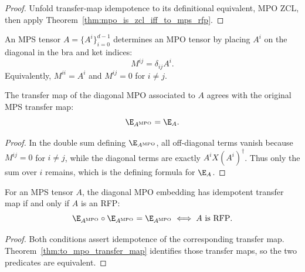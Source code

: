 \begin{proof}
    \leanok
    Unfold transfer-map idempotence to its definitional equivalent, MPO ZCL,
    then apply Theorem~\ref{thm:mpo_is_zcl_iff_to_mps_rfp}.
\end{proof}

\begin{definition}\label{def:to_mpo_tensor}
    \leanok
    An MPS tensor $A = \{A^i\}_{i=0}^{d-1}$ determines an MPO tensor by
    placing $A^i$ on the diagonal in the bra and ket indices:
    \[
        M^{ij} = \delta_{ij} A^i.
    \]
    Equivalently, $M^{ii} = A^i$ and $M^{ij} = 0$ for $i \ne j$.
\end{definition}

\begin{theorem}%
    \label{thm:to_mpo_transfer_map}
    \leanok
    The transfer map of the diagonal MPO associated to $A$ agrees with the
    original MPS transfer map:
    \[
        \E_{A^{\mathrm{MPO}}} = \E_A.
    \]
\end{theorem}

\begin{proof}
    \leanok
    In the double sum defining $\E_{A^{\mathrm{MPO}}}$, all off-diagonal terms
    vanish because $M^{ij} = 0$ for $i \ne j$, while the diagonal terms are
    exactly $A^i X (A^i)^\dagger$. Thus only the sum over $i$ remains, which
    is the defining formula for $\E_A$.
\end{proof}

\begin{theorem}%
    \label{thm:to_mpo_rfp_iff_rfp}
    \leanok
    For an MPS tensor $A$, the diagonal MPO embedding has idempotent transfer
    map if and only if $A$ is an RFP:
    \[
        \E_{A^{\mathrm{MPO}}}\circ\E_{A^{\mathrm{MPO}}}
        = \E_{A^{\mathrm{MPO}}}
        \iff A \text{ is RFP}.
    \]
\end{theorem}

\begin{proof}
    \leanok
    Both conditions assert idempotence of the corresponding transfer map.
    Theorem~\ref{thm:to_mpo_transfer_map} identifies those transfer maps, so
    the two predicates are equivalent.
\end{proof}

